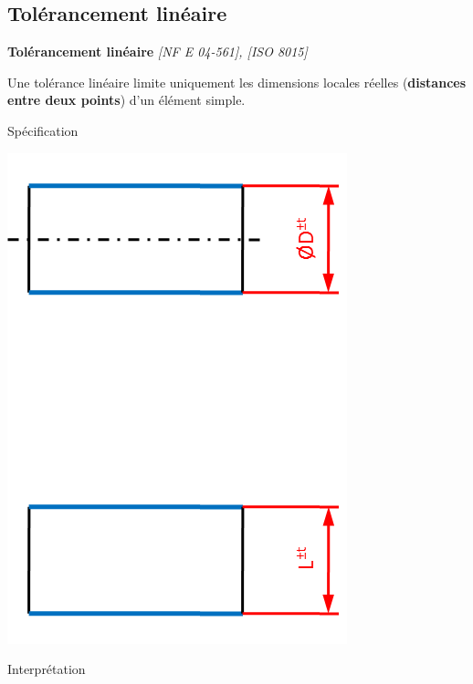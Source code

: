 \documentclass[11pt,oneside]{article}
\begin{document}
\subsection{Tolérancement linéaire}

\begin{resultat}
\textbf{Tolérancement linéaire} \textit{[NF E 04-561], [ISO 8015]}

Une tolérance linéaire limite uniquement les dimensions locales réelles (\textbf{distances entre deux points}) d'un élément simple.

\end{resultat}

\begin{resultat}
\begin{minipage}[t]{.3\linewidth}
\begin{center}
Spécification

\includegraphics[width=.95\textwidth]{png/lin}
\end{center}
\end{minipage} \hfill
\begin{minipage}[t]{.3\linewidth}
\begin{center}
Interprétation
\end{center}


\end{minipage}
\end{resultat}
\end{document}
